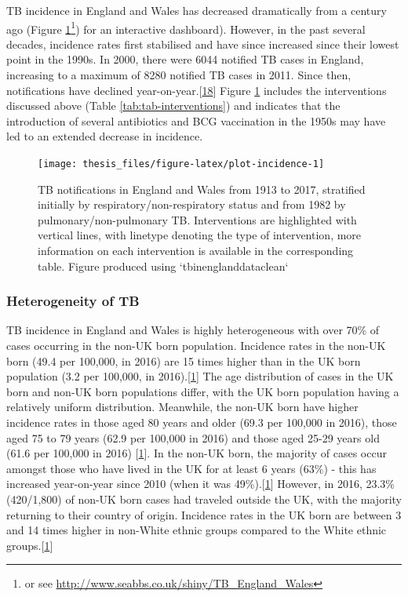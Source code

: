 \documentclass[11pt,twoside]{bristolthesis}
\begin{document}
  TB incidence in England and Wales has decreased dramatically from a century ago (Figure \ref{fig:plot-incidence}\footnote{or see \url{http://www.seabbs.co.uk/shiny/TB_England_Wales}}) for an interactive dashboard). However, in the past several decades, incidence rates first stabilised and have since increased since their lowest point in the 1990s. In 2000, there were 6044 notified TB cases in England, increasing to a maximum of 8280 notified TB cases in 2011. Since then, notifications have declined year-on-year.{[}\protect\hyperlink{ref-PHE2016a}{18}{]} Figure \ref{fig:plot-incidence} includes the interventions discussed above (Table \ref{tab:tab-interventions}) and indicates that the introduction of several antibiotics and BCG vaccination in the 1950s may have led to an extended decrease in incidence.
  \begin{figure}
  
  {\centering \texttt{[image: thesis\_files/figure-latex/plot-incidence-1]} 
  
  }
  
  \caption[TB notifications in England and Wales from 1913 to 2017, stratified initially by respiratory/non-respiratory status and from 1982 by pulmonary/non-pulmonary TB.]{TB notifications in England and Wales from 1913 to 2017, stratified initially by respiratory/non-respiratory status and from 1982 by pulmonary/non-pulmonary TB. Interventions are highlighted with vertical lines, with linetype denoting the type of intervention, more information on each intervention is available in the corresponding table. Figure produced using `tbinenglanddataclean`}\label{fig:plot-incidence}
  \end{figure}
  \hypertarget{heterogeneity-of-tb}{%
  \subsubsection{Heterogeneity of TB}\label{heterogeneity-of-tb}}
  
  TB incidence in England and Wales is highly heterogeneous with over 70\% of cases occurring in the non-UK born population. Incidence rates in the non-UK born (49.4 per 100,000, in 2016) are 15 times higher than in the UK born population (3.2 per
  100,000, in 2016).{[}\protect\hyperlink{ref-PHE2017}{1}{]} The age distribution of cases in the UK born and non-UK born populations differ, with the UK born population having a relatively uniform distribution. Meanwhile, the non-UK born have higher incidence rates in those aged 80 years and older (69.3 per 100,000 in 2016), those aged 75 to 79 years (62.9 per 100,000 in 2016) and those aged 25-29 years old (61.6 per 100,000 in 2016) {[}\protect\hyperlink{ref-PHE2017}{1}{]}. In the non-UK born, the majority of cases occur amongst those who have lived in the UK for at least 6 years (63\%) - this has increased year-on-year since 2010 (when it was 49\%).{[}\protect\hyperlink{ref-PHE2017}{1}{]} However, in 2016, 23.3\% (420/1,800) of non-UK born cases had traveled outside the UK, with the majority returning to their country of origin. Incidence rates in the UK born are between 3 and 14 times higher in non-White ethnic groups compared to the White ethnic groups.{[}\protect\hyperlink{ref-PHE2017}{1}{]}
  
\end{document}
